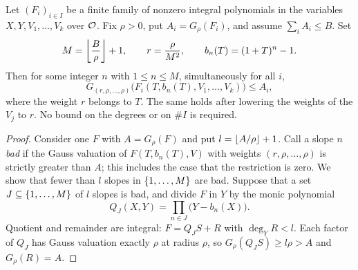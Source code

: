 \begin{lemma}\label{tors:lem:slopes}
Let $(F_i)_{i\in I}$ be a finite family of nonzero integral polynomials in the variables
$X,Y,V_1,\dots,V_k$ over $\OO$. Fix $\rho>0$, put $A_i=G_\rho(F_i)$, and assume
$\sum_iA_i\le B$. Set
\[
  M=\floor*{\frac B\rho}+1,\qquad r=\frac{\rho}{M^2},\qquad b_n(T)=(1+T)^n-1 .
\]
Then for some integer $n$ with $1\le n\le M$, simultaneously for all $i$,
\[
  G_{(r,\rho,\dots,\rho)}\bigl(F_i(T,b_n(T),V_1,\dots,V_k)\bigr)\le A_i ,
\]
where the weight $r$ belongs to $T$. The same holds after lowering the weights of the
$V_j$ to $r$. No bound on the degrees or on $\#I$ is required.
\end{lemma}

\begin{proof}
Consider one $F$ with $A=G_\rho(F)$ and put $l=\floor{A/\rho}+1$. Call a slope $n$
\emph{bad} if the Gauss valuation of $F(T,b_n(T),V)$ with weights $(r,\rho,\dots,\rho)$
is strictly greater than $A$; this includes the case that the restriction is zero. We
show that fewer than $l$ slopes in $\set{1,\dots,M}$ are bad. Suppose that a set
$J\subseteq\set{1,\dots,M}$ of $l$ slopes is bad, and divide $F$ in $Y$ by the monic
polynomial
\[
  Q_J(X,Y)=\prod_{n\in J}\bigl(Y-b_n(X)\bigr).
\]
Quotient and remainder are integral: $F=Q_JS+R$ with $\deg_YR<l$. Each factor of $Q_J$
has Gauss valuation exactly $\rho$ at radius $\rho$, so $G_\rho(Q_JS)\ge l\rho>A$ and
$G_\rho(R)=A$.


\end{proof}
